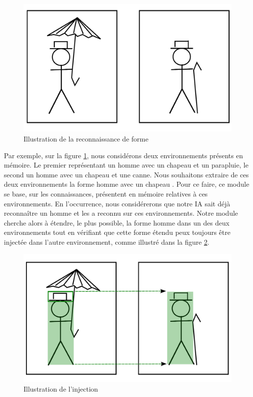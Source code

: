 \begin{figure}[H] 
\includegraphics[width=\textwidth]{files/raisonneur/reconnaissance_de_formes_0} 
\caption{Illustration de la reconnaissance de forme} 
\label{img_reco_forme_0}
\end{figure}

Par exemple, sur la figure \ref{img_reco_forme_0}, nous considérons deux environnements présents en mémoire. Le premier représentant un homme avec un chapeau et un parapluie, le second un homme avec un chapeau et une canne. Nous souhaitons extraire de ces deux environnements la forme \og homme avec un chapeau \fg{}. Pour ce faire, ce module se base, sur les connaissances, présentent en mémoire relatives à ces environnements. En l'occurrence, nous considérerons que notre IA sait déjà reconnaître un homme et les a reconnu sur ces environnements. Notre module cherche alors à étendre, le plus possible, la forme \og homme \fg dans un des deux environnements tout en vérifiant que cette forme étendu peux toujours être injectée dans l'autre environnement, comme illustré dans la figure \ref{img_reco_forme_injection}.

\begin{figure}[H] 
\includegraphics[width=\textwidth]{files/raisonneur/reconnaissance_de_formes_injection} 
\caption{Illustration de l'injection} 
\label{img_reco_forme_injection}
\end{figure}

